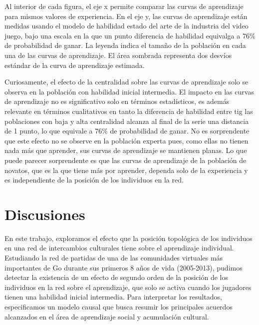 \documentclass[a4paper,11pt]{book}
\theoremstyle{definition}
\begin{document}
%
Al interior de cada figura, el eje x permite comparar las curvas de aprendizaje para mismos valores de experiencia.
%
En el eje y, las curvas de aprendizaje est\'an medidas usando el modelo de habilidad estado del arte de la industria del video juego, bajo una escala en la que un punto diferencia de habilidad equivalga a 76\% de probabilidad de ganar.
%
La leyenda indica el tama\~no de la poblaci\'on en cada una de las curvas de aprendizaje.
%
El \'area sombrada representa dos desv\'ios est\'andar de la curva de aprendizaje estimada.


Curiosamente, el efecto de la centralidad sobre las curvas de aprendizaje solo se observa en la poblaci\'on con habilidad inicial intermedia.
%
El impacto en las curvas de aprendizaje no es significativo solo en t\'erminos estad\'isticos, es adem\'as relevante en t\'erminos cualitativos en tanto la diferencia de habilidad entre tig
las poblaciones con baja y alta centralidad alcanza al final de la serie una distancia de 1 punto, lo que equivale a 76\% de probabilidad de ganar.
%
No es sorprendente que este efecto no se observe en la poblaci\'on experta pues, como ellas no tienen nada m\'as que aprender, sus curvas de aprendizaje se mantienen planas.
%
Lo que puede parecer sorprendente es que las curvas de aprendizaje de la poblaci\'on de novatos, que es la que tiene m\'as por aprender, dependa solo de la experiencia y es independiente de la posici\'on de los individuos en la red.

%

\section{Discusiones}


En este trabajo, exploramos el efecto que la posici\'on topol\'ogica de los individuos en una red de intercambios culturales tiene sobre el aprendizaje individual.
%
Estudiando la red de partidas de una de las comunidades virtuales m\'as importantes de Go durante sus primeros 8 a\~nos de vida (2005-2013), pudimos detectar la existencia de un efecto de segundo orden de la posici\'on de los individuos en la red sobre el aprendizaje, que solo se activa cuando los jugadores tienen una habilidad inicial intermedia.
%
Para interpretar los resultados, especificamos un modelo causal que busca resumir los principales acuerdos alcanzados en el \'area de aprendizaje social y acumulaci\'on cultural.

\end{document}
